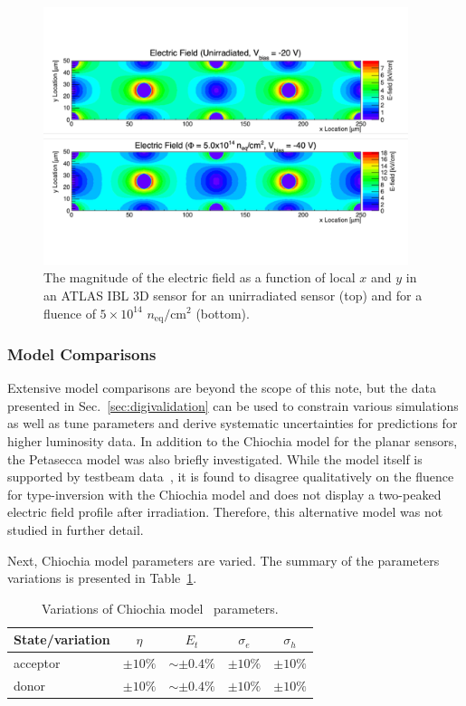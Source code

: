 \begin{figure}[!htpb]
\centering
\includegraphics[width=0.95\textwidth]{Figure7.pdf}
\caption{The magnitude of the electric field as a function of local $x$ and $y$ in an ATLAS IBL 3D sensor for an unirradiated sensor (top) and for a fluence of $5\times10^{14}$ $n_\text{eq}/\text{cm}^2$ (bottom). }
\label{fig:electricfield:profilesRun23_3D}
\end{figure}

\subsubsection{Model Comparisons}
\label{sec:Efieldmodelcomparisons}

Extensive model comparisons are beyond the scope of this note, but the data presented in Sec.~\ref{sec:digivalidation} can be used to constrain various simulations as well as tune parameters and derive systematic uncertainties for predictions for higher luminosity data.  In addition to the Chiochia model for the planar sensors, the Petasecca model was also briefly investigated.  While the model itself is supported by testbeam data~\cite{1710302}, it is found to disagree qualitatively on the fluence for type-inversion with the Chiochia model and does not display a two-peaked electric field profile after irradiation.  Therefore, this alternative model was not studied in further detail.

Next, Chiochia model parameters are varied.
The summary of the parameters variations is presented in Table~\ref{tab:parVars}.

\begin{table}[!htpb]
\centering
\begin{tabular}{|l|c|c|c|c|}
  \hline
  State/variation & $\eta$ & $E_t$ & $\sigma_e$ & $\sigma_h$		\\
   \hline	
   acceptor & $\pm 10\%$ & $\sim\pm0.4\%$ & $\pm10\%$ & $\pm10\%$ \\
   donor & $\pm 10\%$ & $\sim\pm0.4\%$ & $\pm10\%$ & $\pm10\%$ \\
  \hline  
\end{tabular}
\caption{Variations of Chiochia model~\cite{Chiochia:2004qh} parameters.}
\label{tab:parVars}
\end{table}

